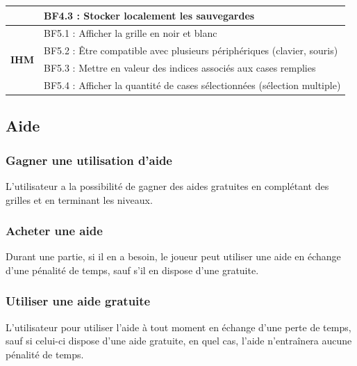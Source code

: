 \documentclass{report}
\begin{document}
\begin{table}[H]
\begin{tabular}{@{}cl@{}}
\multicolumn{1}{|c|}{}                                      & \multicolumn{1}{l|}{BF4.3 : Stocker localement les sauvegardes}                               \\ \midrule
\multicolumn{1}{|c|}{\multirow{4}{*}{\textbf{IHM}}}         & \multicolumn{1}{l|}{BF5.1 : Afficher la grille en noir et blanc}                              \\ \cmidrule(l){2-2} 
\multicolumn{1}{|c|}{}                                      & \multicolumn{1}{l|}{BF5.2 : Être compatible avec plusieurs périphériques (clavier, souris)}   \\ \cmidrule(l){2-2} 
\multicolumn{1}{|c|}{}                                      & \multicolumn{1}{l|}{BF5.3 : Mettre en valeur des indices associés aux cases remplies}        \\ \cmidrule(l){2-2} 
\multicolumn{1}{|c|}{}                                      & \multicolumn{1}{l|}{BF5.4 : Afficher la quantité de cases sélectionnées (sélection multiple)} \\ \bottomrule
\end{tabular}
\end{table}    
    
\renewcommand\thesubsection{\arabic{subsection}}
 \setcounter{secnumdepth}{5}
 
 	\subsection{Aide}
 	    \subsubsection{Gagner une utilisation d'aide}
 	            L'utilisateur a la possibilité de gagner des aides gratuites en complétant des grilles et en terminant les niveaux.
 		\subsubsection{Acheter une aide}
 			    Durant une partie, si il en a besoin, le joueur peut utiliser une aide en échange d'une pénalité de temps, sauf s'il en dispose d'une gratuite.
		\subsubsection{Utiliser une aide gratuite}
				L'utilisateur pour utiliser l'aide à tout moment en échange d'une perte de temps, sauf si celui-ci dispose d'une aide gratuite, en quel cas, l'aide n'entraînera aucune pénalité de temps.
\end{document}
